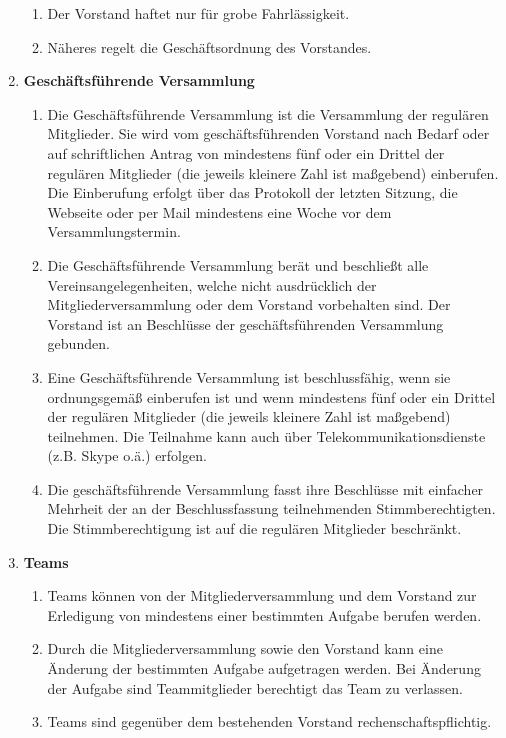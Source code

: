 \documentclass[german]{article}
\newcommand{\paragr}[1]{\item \textsf{\textbf{#1}}}
\begin{document}
\begin{enumerate}
\begin{enumerate}
\item Der Vorstand haftet nur für grobe Fahrlässigkeit.

\item Näheres regelt die Geschäftsordnung des Vorstandes.

\end{enumerate}

\paragr{Geschäftsführende Versammlung}
\begin{enumerate}
\item Die Geschäftsführende Versammlung ist die Versammlung der regulären Mitglieder. Sie wird vom geschäftsführenden Vorstand nach Bedarf oder auf schriftlichen Antrag von mindestens fünf oder ein Drittel der regulären Mitglieder (die jeweils kleinere Zahl ist maßgebend) einberufen. Die Einberufung erfolgt über das Protokoll der letzten Sitzung, die Webseite oder per Mail mindestens eine Woche vor dem Versammlungstermin.
\item Die Geschäftsführende Versammlung berät und beschließt alle Vereinsangelegenheiten, welche nicht ausdrücklich der Mitgliederversammlung oder dem Vorstand vorbehalten sind. Der Vorstand ist an Beschlüsse der geschäftsführenden Versammlung gebunden.
\item Eine Geschäftsführende Versammlung ist beschlussfähig, wenn sie ordnungsgemäß einberufen ist und wenn mindestens fünf oder ein Drittel der regulären Mitglieder (die jeweils kleinere Zahl ist maßgebend) teilnehmen. Die Teilnahme kann auch über Telekommunikationsdienste (z.B. Skype o.ä.) erfolgen.
\item Die geschäftsführende Versammlung fasst ihre Beschlüsse mit einfacher Mehrheit der an der Beschlussfassung teilnehmenden Stimmberechtigten. Die Stimmberechtigung ist auf die regulären Mitglieder beschränkt.
\end{enumerate}


\paragr{Teams}
\begin{enumerate}

\item Teams können von der Mitgliederversammlung und dem Vorstand zur Erledigung von mindestens einer bestimmten Aufgabe berufen werden.

\item Durch die Mitgliederversammlung sowie den Vorstand kann eine Änderung der bestimmten Aufgabe aufgetragen werden. Bei Änderung der Aufgabe sind Teammitglieder berechtigt das Team zu verlassen.

\item Teams sind gegenüber dem bestehenden Vorstand rechenschaftspflichtig.


\end{enumerate}
\end{enumerate}
\end{document}
